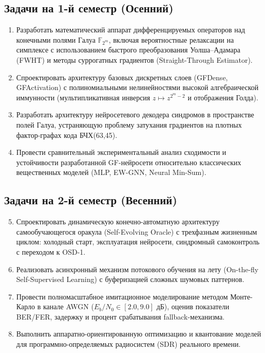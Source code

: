 \documentclass[12pt,a4paper]{article}
\begin{document}
\subsection*{Задачи на 1-й семестр (Осенний)}
\begin{enumerate}
    \item Разработать математический аппарат дифференцируемых операторов над конечными полями Галуа $\mathbb{F}_{2^m}$, включая вероятностные релаксации на симплексе с использованием быстрого преобразования Уолша--Адамара (FWHT) и методы суррогатных градиентов (Straight-Through Estimator).
    \item Спроектировать архитектуру базовых дискретных слоев (GFDense, GFActivation) с полиномиальными нелинейностями высокой алгебраической иммунности (мультипликативная инверсия $z \mapsto z^{2^m-2}$ и отображения Голда).
    \item Разработать архитектуру нейросетевого декодера синдромов в пространстве полей Галуа, устраняющую проблему затухания градиентов на плотных фактор-графах кода БЧХ(63,45).
    \item Провести сравнительный экспериментальный анализ сходимости и устойчивости разработанной GF-нейросети относительно классических вещественных моделей (MLP, EW-GNN, Neural Min-Sum).
\end{enumerate}

\subsection*{Задачи на 2-й семестр (Весенний)}
\begin{enumerate}
    \setcounter{enumi}{4}
    \item Спроектировать динамическую конечно-автоматную архитектуру самообучающегося оракула (Self-Evolving Oracle) с трехфазным жизненным циклом: холодный старт, эксплуатация нейросети, синдромный самоконтроль с переходом к OSD-1.
    \item Реализовать асинхронный механизм потокового обучения на лету (On-the-fly Self-Supervised Learning) с буферизацией сложных шумовых паттернов.
    \item Провести полномасштабное имитационное моделирование методом Монте-Карло в канале AWGN ($E_b/N_0 \in [2.0, 9.0]$ дБ), оценив показатели BER/FER, задержку и процент срабатывания fallback-механизма.
    \item Выполнить аппаратно-ориентированную оптимизацию и квантование моделей для программно-определяемых радиосистем (SDR) реального времени.
\end{enumerate}
\end{document}

